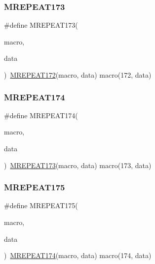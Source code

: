 \mbox{\label{group__group__sam0__utils__mrepeat_ga5882213b7cc6587681221c190929a058}} 
\subsubsection{\texorpdfstring{MREPEAT173}{MREPEAT173}}
{\footnotesize\ttfamily \#define M\+R\+E\+P\+E\+A\+T173(\begin{DoxyParamCaption}\item[{}]{macro,  }\item[{}]{data }\end{DoxyParamCaption})~\mbox{\hyperlink{group__group__sam0__utils__mrepeat_ga6eb1cc1bab798bbc69ffcf54897bb268}{M\+R\+E\+P\+E\+A\+T172}}(macro, data)   macro(172, data)}

\mbox{\label{group__group__sam0__utils__mrepeat_ga2a61cb0b2664714f05b8b60b1430e182}} 
\subsubsection{\texorpdfstring{MREPEAT174}{MREPEAT174}}
{\footnotesize\ttfamily \#define M\+R\+E\+P\+E\+A\+T174(\begin{DoxyParamCaption}\item[{}]{macro,  }\item[{}]{data }\end{DoxyParamCaption})~\mbox{\hyperlink{group__group__sam0__utils__mrepeat_ga5882213b7cc6587681221c190929a058}{M\+R\+E\+P\+E\+A\+T173}}(macro, data)   macro(173, data)}

\mbox{\label{group__group__sam0__utils__mrepeat_gaaad2bc103b928f34a3dc0a556f252b02}} 
\subsubsection{\texorpdfstring{MREPEAT175}{MREPEAT175}}
{\footnotesize\ttfamily \#define M\+R\+E\+P\+E\+A\+T175(\begin{DoxyParamCaption}\item[{}]{macro,  }\item[{}]{data }\end{DoxyParamCaption})~\mbox{\hyperlink{group__group__sam0__utils__mrepeat_ga2a61cb0b2664714f05b8b60b1430e182}{M\+R\+E\+P\+E\+A\+T174}}(macro, data)   macro(174, data)}

